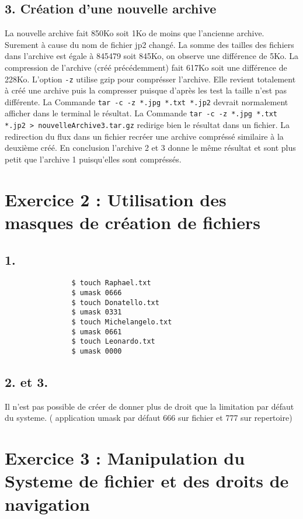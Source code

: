         \subsection{3. Création d'une nouvelle archive}
            La nouvelle archive fait 850Ko soit 1Ko de moins que l'ancienne archive. Surement à cause du nom de fichier jp2 changé.
            La somme des tailles des fichiers dans l'archive est égale à 845479 soit 845Ko, on observe une différence de 5Ko.
            La compression de l'archive (créé précédemment) fait 617Ko soit une différence de 228Ko.
            L'option \texttt{-z} utilise gzip pour comprésser l'archive.
            Elle revient totalement à créé une archive puis la compresser puisque d'après les test la taille n'est pas différente.
            La Commande \texttt{tar -c -z *.jpg *.txt *.jp2} devrait normalement afficher dans le terminal le résultat.
            La Commande \texttt{tar -c -z *.jpg *.txt *.jp2 > nouvelleArchive3.tar.gz} redirige bien le résultat dans un fichier.
            La redirection du flux dans un fichier recréer une archive compréssé similaire à la deuxième créé.
            En conclusion l'archive 2 et 3 donne le même résultat et sont plus petit que l'archive 1 puisqu'elles sont compréssés.
    \section{Exercice 2 : Utilisation des masques de création de fichiers}
        \subsection{1.}
            \begin{verbatim}
                $ touch Raphael.txt
                $ umask 0666
                $ touch Donatello.txt
                $ umask 0331
                $ touch Michelangelo.txt
                $ umask 0661
                $ touch Leonardo.txt
                $ umask 0000
            \end{verbatim}
        \subsection{2. et 3.}
            Il n'est pas possible de créer de donner plus de droit que la limitation par défaut du systeme.
            ( application umask par défaut 666 sur fichier et 777 sur repertoire)
    \section{Exercice 3 : Manipulation du Systeme de fichier et des droits de navigation}
